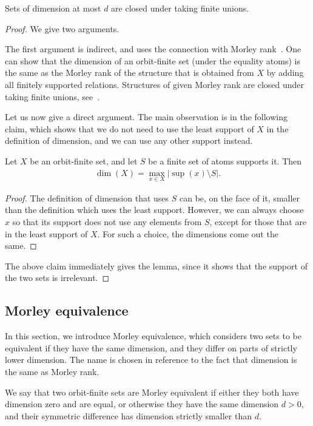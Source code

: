\begin{lemma}\label{lem:dimension-unions}
	Sets of dimension at most $d$ are closed under taking finite unions.
\end{lemma}
\begin{proof}
	We give two arguments.

	The first argument is indirect, and uses the connection with Morley rank~\cite[p.~240]{hodges1993model}. One can show that the dimension of an orbit-finite set (under the equality atoms) is the same as the Morley rank of the structure that is obtained from $X$ by adding all finitely supported relations. Structures of given Morley rank are closed under taking finite unions, see~\cite[p. 225]{Ziegler_2008}.

	Let us now give a direct argument. The main observation is in the following claim, which shows that we do not need to use the least support of $X$ in the definition of dimension, and we can use any other support instead.

	\begin{claim}\label{claim:dimension-supports}
		Let $X$ be an orbit-finite set, and let $S$ be a finite set of atoms supports it. Then
		\begin{align*}
			\dim(X) = \max_{x \in X} |\sup(x) \setminus S|.
		\end{align*}
	\end{claim}
	\begin{proof}
		The definition of dimension that uses $S$ can be, on the face of it, smaller than the definition which uses the least support. However, we can always choose $x$ so that its support does not use any elements from $S$, except for those that are in the least support of $X$. For such a choice, the dimensions come out the same.
	\end{proof}
	The above claim immediately gives the lemma, since it shows that the support of the two sets is irrelevant.
\end{proof}


\subsection{Morley equivalence}
\label{sec:morley-equivalence}
In this section, we introduce Morley equivalence, which considers two sets to be equivalent if they have the same dimension, and they differ on parts of strictly lower dimension. The name is chosen in reference to the fact that dimension is the same as Morley rank.

\begin{definition} We say that two orbit-finite sets  are Morley equivalent if either they both have dimension zero and are equal, or otherwise they have the same dimension $d>0$,  and their symmetric difference  has dimension strictly smaller than $d$.
\end{definition}


